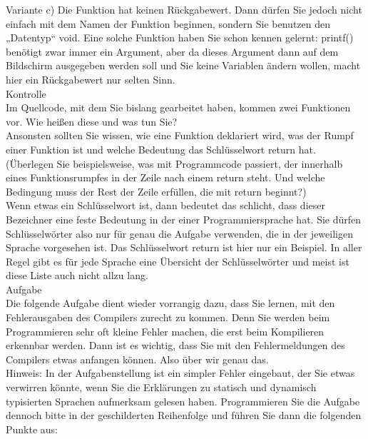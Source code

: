 Variante c) Die Funktion hat keinen Rückgabewert. Dann dürfen Sie jedoch nicht einfach mit dem Namen der Funktion beginnen, sondern Sie benutzen den „Datentyp“ void. Eine solche Funktion haben Sie schon kennen gelernt: printf() benötigt zwar immer ein Argument, aber da dieses Argument dann auf dem Bildschirm ausgegeben werden soll und Sie keine Variablen ändern wollen, macht hier ein Rückgabewert nur selten Sinn.\\

Kontrolle\\

Im Quellcode, mit dem Sie bislang gearbeitet haben, kommen zwei Funktionen vor. Wie heißen diese und was tun Sie?\\

Ansonsten sollten Sie wissen, wie eine Funktion deklariert wird, was der Rumpf einer Funktion ist und welche Bedeutung das Schlüsselwort return hat. (Überlegen Sie beispielsweise, was mit Programmcode passiert, der innerhalb eines Funktionsrumpfes in der Zeile nach einem return steht. Und welche Bedingung muss der Rest der Zeile erfüllen, die mit return beginnt?)\\

Wenn etwas ein Schlüsselwort ist, dann bedeutet das schlicht, dass dieser Bezeichner eine feste Bedeutung in der einer Programmiersprache hat. Sie dürfen Schlüsselwörter also nur für genau die Aufgabe verwenden, die in der jeweiligen Sprache vorgesehen ist. Das Schlüsselwort return ist hier nur ein Beispiel. In aller Regel gibt es für jede Sprache eine Übersicht der Schlüsselwörter und meist ist diese Liste auch nicht allzu lang.\\

Aufgabe\\

Die folgende Aufgabe dient wieder vorrangig dazu, dass Sie lernen, mit den Fehlerausgaben des Compilers zurecht zu kommen. Denn Sie werden beim Programmieren sehr oft kleine Fehler machen, die erst beim Kompilieren erkennbar werden. Dann ist es wichtig, dass Sie mit den Fehlermeldungen des Compilers etwas anfangen können. Also über wir genau das. \\

Hinweis: In der Aufgabenstellung ist ein simpler Fehler eingebaut, der Sie etwas verwirren könnte, wenn Sie die Erklärungen zu statisch und dynamisch typisierten Sprachen aufmerksam gelesen haben. Programmieren Sie die Aufgabe dennoch bitte in der geschilderten Reihenfolge und führen Sie dann die folgenden Punkte aus:\\

